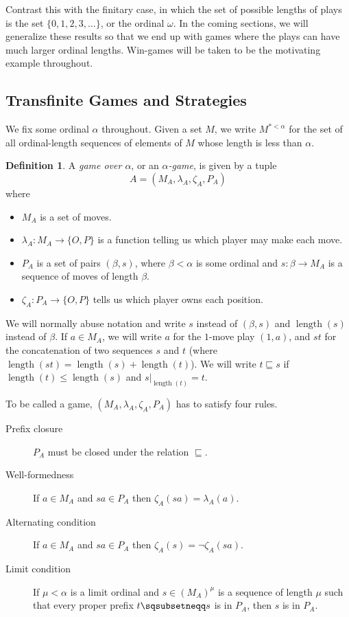 \documentclass[11pt]{article} %
\theoremstyle{plain} %
\theoremstyle{definition} %
\newtheorem{definition}[theorem]{Definition}
\theoremstyle{note}
\theoremstyle{exercisestyle}
\newcommand*\from{\colon}
\newcommand{\cmap}[3]{#1\from{}#2\to{}#3}
\newcommand{\OP}{\{O,P\}}
\newcommand{\prefix}{\sqsubseteq}
\newcommand{\pprefix}{\sqsubsetneqq}
\DeclareMathOperator{\length}{length}
\begin{document}
Contrast this with the finitary case, in which the set of possible lengths of plays is the set $\{0,1,2,3,\dots\}$, or the ordinal $\omega$.  In the coming sections, we will generalize these results so that we end up with games where the plays can have much larger ordinal lengths.  Win-games will be taken to be the motivating example throughout.  

\subsection{Transfinite Games and Strategies}

We fix some ordinal $\alpha$ throughout.  Given a set $M$, we write $M^{*<\alpha}$ for the set of all ordinal-length sequences of elements of $M$ whose length is less than $\alpha$.  

\begin{definition}
  A \emph{game over $\alpha$}, or an \emph{$\alpha$-game}, is given by a tuple
  \[
    A = (M_A, \lambda_A, \zeta_A, P_A)
    \]
  where
  \begin{itemize}
    \item $M_A$ is a set of moves.
    \item $\cmap{\lambda_A}{M_A}{\OP}$ is a function telling us which player may make each move.
    \item $P_A$ is a set of pairs $(\beta, s)$, where $\beta<\alpha$ is some ordinal and $\cmap{s}{\beta}{M_A}$ is a sequence of moves of length $\beta$.  
    \item $\cmap{\zeta_A}{P_A}{\OP}$ tells us which player owns each position.
  \end{itemize}

  We will normally abuse notation and write $s$ instead of $(\beta, s)$ and $\length(s)$ instead of $\beta$.  If $a\in M_A$, we will write $a$ for the $1$-move play $(1, a)$, and $st$ for the concatenation of two sequences $s$ and $t$ (where $\length(st)=\length(s)+\length(t)$).  We will write $t\prefix s$ if $\length(t)\le\length(s)$ and $s\vert_{\length(t)}=t$.  

  To be called a game, $(M_A, \lambda_A, \zeta_A, P_A)$ has to satisfy four rules.
  \begin{description}
    \item[Prefix closure] $P_A$ must be closed under the relation $\prefix$.  
    \item[Well-formedness] If $a\in M_A$ and $sa\in P_A$ then $\zeta_A(sa)=\lambda_A(a)$.  
    \item[Alternating condition] If $a\in M_A$ and $sa\in P_A$ then $\zeta_A(s)=\neg\zeta_A(sa)$.
    \item[Limit condition] If $\mu<\alpha$ is a limit ordinal and $s\in(M_A)^\mu$ is a sequence of length $\mu$ such that every proper prefix $t\pprefix s$ is in $P_A$, then $s$ is in $P_A$.  
  \end{description}
\end{definition}
\end{document}

